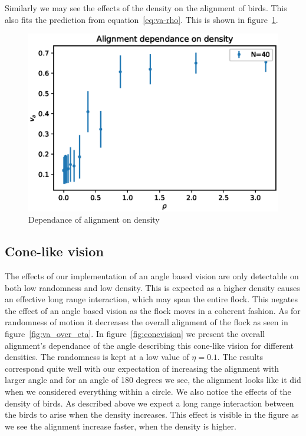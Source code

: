 \documentclass[twoside,twocolumn]{article}
\begin{document}
Similarly we may see the effects of the density on the alignment of birds. This also fits the prediction from equation~\eqref{eq:va-rho}. This is shown in figure~\ref{fig:va_over_rho}.

\begin{figure}[!htb]
	\centering
	\includegraphics[width=\columnwidth]{va_over_rho}
	\caption{Dependance of alignment on density}
  \label{fig:va_over_rho}
\end{figure}

\subsection{Cone-like vision}
\label{subsec:conevision}

The effects of our implementation of an angle based vision are only detectable on both low randomness and low density. This is expected as a higher density causes an effective long range interaction, which may span the entire flock. This negates the effect of an angle based vision as the flock moves in a coherent fashion. As for randomness of motion it decreases the overall alignment of the flock as seen in figure~\ref{fig:va_over_eta}. In figure~\ref{fig:conevision} we present the overall alignment's dependance of the angle describing this cone-like vision for different densities. The randomness is kept at a low value of $\eta=0.1$. The results correspond quite well with our expectation of increasing the alignment with larger angle and for an angle of 180 degrees we see, the alignment looks like it did when we considered everything within a circle. We also notice the effects of the density of birds. As described above we expect a long range interaction between the birds to arise when the density increases. This effect is visible in the figure as we see the alignment increase faster, when the density is higher.
\end{document}
